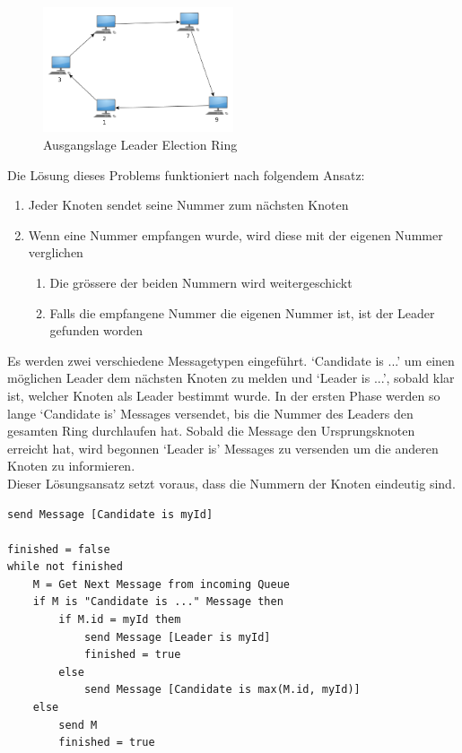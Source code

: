 \begin{figure}[h]
	\centering
		\includegraphics[width=0.5\textwidth]{bilder/ring.png}
	\caption{\label{fig:network}Ausgangslage Leader Election Ring}
\end{figure}

Die Lösung dieses Problems funktioniert nach folgendem Ansatz:

\begin{enumerate}
  	\item Jeder Knoten sendet seine Nummer zum nächsten Knoten
 	\item Wenn eine Nummer empfangen wurde, wird diese mit der eigenen Nummer verglichen
 	\begin{enumerate}
		\item Die grössere der beiden Nummern wird weitergeschickt
        \item Falls die empfangene Nummer die eigenen Nummer ist, ist der Leader gefunden worden
	\end{enumerate}
\end{enumerate}

Es werden zwei verschiedene Messagetypen eingeführt. `Candidate is ...' um einen möglichen Leader dem nächsten Knoten zu melden und `Leader is ...', sobald klar ist, welcher Knoten als Leader bestimmt wurde.
In der ersten Phase werden so lange `Candidate is' Messages versendet, bis die Nummer des Leaders den gesamten Ring durchlaufen hat. Sobald die Message den Ursprungsknoten erreicht hat, wird begonnen `Leader is' Messages zu versenden um die anderen Knoten zu informieren. \\
Dieser Lösungsansatz setzt voraus, dass die Nummern der Knoten eindeutig sind. 

\newpage

\lstset{style=pseudocode}
\begin{lstlisting}[caption=Pseudocode Asynchrone Leader Election in einen Ring Netzwerk]
send Message [Candidate is myId]

finished = false
while not finished
    M = Get Next Message from incoming Queue
    if M is "Candidate is ..." Message then
        if M.id = myId them
            send Message [Leader is myId]
            finished = true
        else
            send Message [Candidate is max(M.id, myId)]
    else
        send M
        finished = true
\end{lstlisting}

